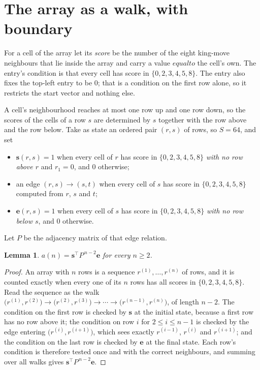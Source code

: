 \documentclass[11pt,a4paper]{article}
\theoremstyle{plain}
\newtheorem{lemma}[theorem]{Lemma}
\theoremstyle{definition}
\begin{document}
\section{The array as a walk, with boundary}

For a cell of the array let its \emph{score} be the number of the eight king-move neighbours that lie inside
the array and carry a value $equal to$ the cell's own. The entry's condition is that every cell
has score in $\{0,2,3,4,5,8\}$. The entry also fixes the top-left entry to be $0$; that is a condition on the first row alone, so it restricts the start vector and nothing else.

A cell's neighbourhood reaches at most one row up and one row down, so the scores of the
cells of a row $s$ are determined by $s$ together with the row above and the row below.
Take as state an ordered pair $(r,s)$ of rows, so $S=64$, and set
\begin{itemize}
\item $\mathbf{s}(r,s)=1$ when every cell of $r$ has score in $\{0,2,3,4,5,8\}$ \emph{with no row
above $r$} and $r_1=0$, and $0$ otherwise;
\item an edge $(r,s)\to(s,t)$ when every cell of $s$ has score in $\{0,2,3,4,5,8\}$ computed from
$r$, $s$ and $t$;
\item $\mathbf{e}(r,s)=1$ when every cell of $s$ has score in $\{0,2,3,4,5,8\}$ \emph{with no row
below $s$}, and $0$ otherwise.
\end{itemize}
Let $P$ be the adjacency matrix of that edge relation.

\begin{lemma}\label{lem:walk}
$a(n)=\mathbf{s}^{\!\top}P^{\,n-2}\mathbf{e}$ for every $n\ge2$.
\end{lemma}

\begin{proof}
An array with $n$ rows is a sequence $r^{(1)},\dots,r^{(n)}$ of rows, and it is counted
exactly when every one of its $n$ rows has all scores in $\{0,2,3,4,5,8\}$. Read the sequence as the
walk $\bigl(r^{(1)},r^{(2)}\bigr)\to\bigl(r^{(2)},r^{(3)}\bigr)\to\cdots\to
\bigl(r^{(n-1)},r^{(n)}\bigr)$, of length $n-2$. The condition on the first row is
checked by $\mathbf{s}$ at the initial state, because a first row has no row above it; the
condition on row $i$ for $2\le i\le n-1$ is checked by the edge entering
$\bigl(r^{(i)},r^{(i+1)}\bigr)$, which sees exactly $r^{(i-1)}$, $r^{(i)}$ and
$r^{(i+1)}$; and the condition on the last row is checked by $\mathbf{e}$ at the final
state. Each row's condition is therefore tested once and with the correct neighbours, and
summing over all walks gives $\mathbf{s}^{\!\top}P^{\,n-2}\mathbf{e}$.
\end{proof}
\end{document}
